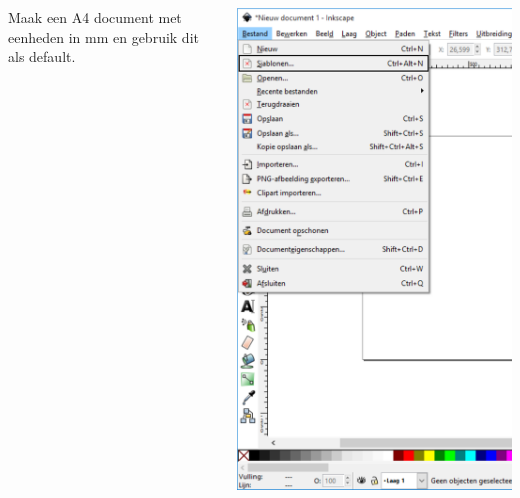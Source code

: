 \documentclass[t]{beamer}
\begin{document}
\begin{frame}
\begin{columns}
\begin{column}[T]{0.6\textwidth}
					\vspace{1cm}
					Maak een A4 document met eenheden in mm en gebruik dit als default.
				\end{column}
				\begin{column}[T]{0.4\textwidth}
					\includegraphics[height=0.8\textheight]{fig/inkscape_sjablonen}
				\end{column}
			\end{columns}
	\end{frame}
\end{document}
